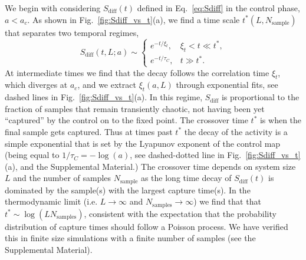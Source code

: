 \documentclass[twocolumn,amsmath,amssymb,floatfix,superscriptaddress,aps,prl]{revtex4-2}
\begin{document}
We begin with considering $S_{\mathrm{diff}}(t)$ defined in Eq.~\eqref{eq:Sdiff} in the control phase, $a< a_c$. As shown in Fig.~\ref{fig:Sdiff_vs_t}(a), we find a time scale $t^*(L,N_{\mathrm{sample}})$ that separates two temporal regimes,
\begin{equation}
S_{\mathrm{diff}}(t,L;a) \sim
\begin{cases}
e^{-t/\xi_t}, & \xi_t < t \ll t^*, \\
e^{-t/\tau_C}, & t \gg t^*.
\end{cases}
\label{eq:t*2}
\end{equation}
At intermediate times we find that the decay follows the correlation time $\xi_{t}$, which diverges at $a_c$, and we  extract $\xi_t(a,L)$ through exponential fits, see dashed lines in Fig.~\ref{fig:Sdiff_vs_t}(a).  In this regime, $S_{\mathrm{diff}}$ is proportional to the fraction of samples that remain transiently chaotic, not having been yet ``captured'' by the control on to the fixed point.  The crossover time $t^*$ is when the final sample gets captured.  Thus  %
at times past $t^*$ the decay of the activity is a simple exponential that is set by the Lyapunov exponent of the control map (being equal to $1/\tau_C=-\log(a)$, see dashed-dotted line in Fig.~\ref{fig:Sdiff_vs_t} (a), and the Supplemental Material.) 
The crossover time depends on system size $L$ and the number of samples $N_{\mathrm{sample}}$ as the long time decay of $S_{\mathrm{diff}}(t)$ is dominated by the sample(s) with the largest capture time(s). In the thermodynamic limit (i.e. $L\rightarrow \infty$ and $N_{\mathrm{samples}}\rightarrow \infty$) we  find that that %
$t^* \sim \log(LN_{\mathrm{samples}})$, consistent with the expectation that the probability distribution of capture times should follow a Poisson process. We have verified this in finite size simulations with a finite number of samples (see the Supplemental Material).
\end{document}

